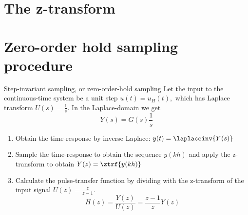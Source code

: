 \documentclass[presentation,aspectratio=169]{beamer}
\begin{document}
\section{The z-transform}
\label{sec:org7643698}

\section{Zero-order hold sampling procedure}
\label{sec:orga9007bd}
\begin{frame}[label={sec:org39bc2f4}]{Step-invariant sampling, or zero-order-hold sampling}
Let the input to the continuous-time system be a unit step \(u(t)=u_H(t),\) which has Laplace transform \(U(s)=\frac{1}{s}.\) In the Laplace-domain we get
\[Y(s) = G(s)\frac{1}{s}\]
\begin{enumerate}
\item Obtain the time-response by inverse Laplace: \(y(t)=\laplaceinv{Y(s)}\)
\item Sample the time-response to obtain the sequence \(y(kh)\) and apply  the z-transform to obtain \(Y(z) = \ztrf{y(kh)}\)
\item Calculate the pulse-transfer function by dividing with the z-transform of the input signal \(U(z) = \frac{z}{z-1}.\) \[H(z) = \frac{Y(z)}{U(z)} = \frac{z-1}{z}Y(z) \]
\end{enumerate}
\end{frame}
\end{document}
